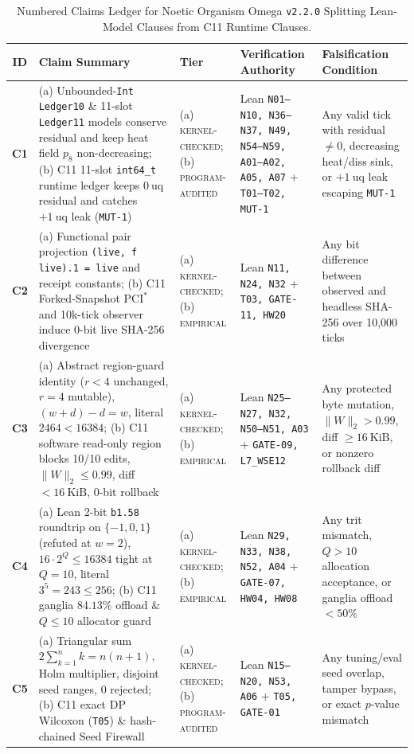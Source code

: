 \documentclass[11pt,reqno]{amsart}
\theoremstyle{remark}
\newcommand{\tagKC}{\textsc{kernel-checked}}
\newcommand{\tagPA}{\textsc{program-audited}}
\newcommand{\tagEM}{\textsc{empirical}}
\begin{document}
\begin{table}[ht]
\centering
\caption{Numbered Claims Ledger for Noetic Organism Omega \texttt{v2.2.0} Splitting Lean-Model Clauses from C11 Runtime Clauses.}
\label{tab:claims}
\footnotesize
\setlength{\tabcolsep}{3.2pt}
\begin{tabular}{@{} c >{\raggedright\arraybackslash}p{4.3cm} >{\raggedright\arraybackslash}p{2.2cm} >{\raggedright\arraybackslash}p{3.1cm} >{\raggedright\arraybackslash}p{3.6cm} @{}}
\toprule
\textbf{ID} & \textbf{Claim Summary} & \textbf{Tier} & \textbf{Verification Authority} & \textbf{Falsification Condition} \\
\midrule
\textbf{C1} & (a) Unbounded-\texttt{Int} \texttt{Ledger10} \& 11-slot \texttt{Ledger11} models conserve residual and keep heat field $p_8$ non-decreasing; (b) C11 11-slot \texttt{int64\_t} runtime ledger keeps $0~\text{uq}$ residual and catches $+1~\text{uq}$ leak (\texttt{MUT-1}) & (a) \tagKC{}; (b) \tagPA{} & Lean \texttt{N01--N10, N36--N37, N49, N54--N59, A01--A02, A05, A07} + \texttt{T01--T02, MUT-1} & Any valid tick with residual $\ne 0$, decreasing heat/diss sink, or $+1~\text{uq}$ leak escaping \texttt{MUT-1} \\
\textbf{C2} & (a) Functional pair projection \texttt{(live, f live).1 = live} and receipt constants; (b) C11 Forked-Snapshot $\text{PCI}^*$ and 10k-tick observer induce 0-bit live SHA-256 divergence & (a) \tagKC{}; (b) \tagEM{} & Lean \texttt{N11, N24, N32} + \texttt{T03, GATE-11, HW20} & Any bit difference between observed and headless SHA-256 over 10,000 ticks \\
\textbf{C3} & (a) Abstract region-guard identity ($r < 4$ unchanged, $r = 4$ mutable), $(w+d)-d=w$, literal $2464 < 16384$; (b) C11 software read-only region blocks 10/10 edits, $\|W\|_2 \le 0.99$, diff $< 16~\text{KiB}$, 0-bit rollback & (a) \tagKC{}; (b) \tagEM{} & Lean \texttt{N25--N27, N32, N50--N51, A03} + \texttt{GATE-09, L7\_WSE12} & Any protected byte mutation, $\|W\|_2 > 0.99$, diff $\ge 16~\text{KiB}$, or nonzero rollback diff \\
\textbf{C4} & (a) Lean 2-bit \texttt{b1.58} roundtrip on $\{-1,0,1\}$ (refuted at $w=2$), $16 \cdot 2^Q \le 16384$ tight at $Q=10$, literal $3^5=243 \le 256$; (b) C11 ganglia $84.13\%$ offload \& $Q \le 10$ allocator guard & (a) \tagKC{}; (b) \tagEM{} & Lean \texttt{N29, N33, N38, N52, A04} + \texttt{GATE-07, HW04, HW08} & Any trit mismatch, $Q > 10$ allocation acceptance, or ganglia offload $< 50\%$ \\
\textbf{C5} & (a) Triangular sum $2 \sum_{k=1}^n k = n(n+1)$, Holm multiplier, disjoint seed ranges, $0$ rejected; (b) C11 exact DP Wilcoxon (\texttt{T05}) \& hash-chained Seed Firewall & (a) \tagKC{}; (b) \tagPA{} & Lean \texttt{N15--N20, N53, A06} + \texttt{T05, GATE-01} & Any tuning/eval seed overlap, tamper bypass, or exact $p$-value mismatch \\

\end{tabular}
\end{table}
\end{document}
